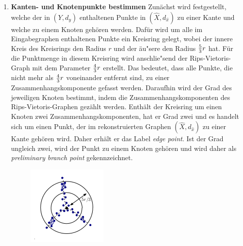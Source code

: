 \documentclass[parskip=half,
 fontsize=12pt, bibtotoc,
 ngerman]
 {article}
\begin{document}
\begin{enumerate}
\item \textbf{Kanten- und Knotenpunkte bestimmen}\newline
Zunächst wird festgestellt, welche der in $\left(Y, d_y\right)$ enthaltenen Punkte in $(\hat{X}, d_{\hat{x}})$ zu einer Kante und welche zu einem Knoten gehören werden. Dafür wird um alle im Eingabegraphen enthaltenen Punkte ein Kreisring gelegt, wobei der innere Kreis des Kreisrings den Radius $r$ und der äu"sere den Radius ${5\over 3}r$ hat. Für die Punktmenge in diesem Kreisring wird anschlie"send der Rips-Vietoris-Graph mit dem Parameter ${4 \over 3}r$ erstellt. Das bedeutet, dass alle Punkte, die nicht mehr als ${4 \over 3}r$ voneinander entfernt sind, zu einer Zusammenhangskomponente gefasst werden. Daraufhin wird der Grad des jeweiligen Knoten bestimmt, indem die Zusammenhangskomponenten des Rips-Vietoris-Graphen gezählt werden. Enthält der Kreisring um einen Knoten zwei Zusammenhangskomponenten, hat er Grad zwei und es handelt sich um einen Punkt, der im rekonstruierten Graphen $(\hat{X}, d_{\hat{x}})$ zu einer Kante gehören wird. Daher erhält er das Label \textit{edge point}. Ist der Grad ungleich zwei, wird der Punkt zu einem Knoten gehören und wird daher als \textit{preliminary branch point} gekennzeichnet.

\begin{figure}[h]
\centering
\includegraphics{branch.png}
\end{figure}


\end{enumerate}
\end{document}
